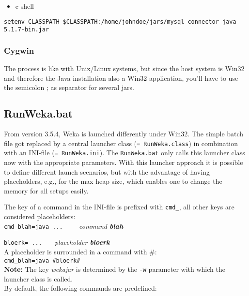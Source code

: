 \begin{itemize}
\item c shell
\end{itemize}

\verb_setenv CLASSPATH $CLASSPATH:/home/johndoe/jars/mysql-connector-java-5.1.7-bin.jar_

\subsubsection*{Cygwin}

The process is like with Unix/Linux systems, but since the host system
is Win32 and therefore the Java installation also a Win32 application,
you'll have to use the semicolon ; as separator for several jars.

\subsection{RunWeka.bat}
\label{RunWeka.ini}

From version 3.5.4, Weka is launched differently under Win32. The
simple batch file got replaced by a central launcher class
(\verb_= RunWeka.class_) in combination with an INI-file
 (\verb_= RunWeka.ini_). The \verb=RunWeka.bat= only calls this
 launcher class now with the appropriate parameters. With this
 launcher approach it is possible to define different launch
 scenarios, but with the advantage of having placeholders, e.g., for
 the max heap size, which enables one to change the memory for all
 setups easily.

The key of a command in the INI-file is prefixed with \verb=cmd_=, all
other keys are considered placeholders:\\

\verb^cmd_blah=java ...    ^ \emph{command \textbf{blah}}

\verb^bloerk= ...   ^ \emph{placeholder \textbf{bloerk}}\\

\noindent A placeholder is surrounded in a command with \#:\\

\verb^cmd_blah=java #bloerk#^\\

\noindent \textbf{Note:} The key \emph{wekajar} is determined by the
\texttt{-w} parameter with which the launcher class is called.\\

\noindent By default, the following commands are predefined:

